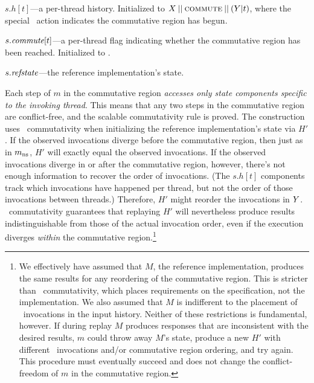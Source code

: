 \begin{CompactItemize}
\item $s.h[t]$---a per-thread history. Initialized to
  $X\mathbin{||}\textsc{commute}\mathbin{||}(Y|t)$, where the special
  \COMMUTE\ action indicates the commutative region has begun.
\item $s.\textit{commute}[t]$---a per-thread flag indicating whether the
  commutative region has been reached. Initialized to \FALSE.
\item $s.\textit{refstate}$---the reference implementation's state.
\end{CompactItemize}

\noindent%
Each step of $m$ in the commutative region \emph{accesses
only state components specific to the invoking thread}.
%
This means that any two steps in the commutative region are
conflict-free, and the scalable commutativity rule is proved.
%
The construction uses \SIM\ commutativity when initializing the
reference implementation's state via $H'$.
%
If the observed invocations diverge before the commutative region, then
just as in $m_{\text{ns}}$, $H'$ will exactly equal the observed invocations.
%
If the observed invocations diverge in or after the commutative region,
however, there's not enough information to recover the order of
invocations. (The $s.h[t]$ components track which invocations have
happened per thread, but not the order of those invocations between
threads.) Therefore, $H'$ might reorder the invocations in $Y$.
%
\SIM\ commutativity guarantees that replaying $H'$ will nevertheless produce
results indistinguishable from those of the actual invocation order,
even if the execution
diverges \emph{within} the commutative region.\footnote{%
  We effectively have assumed that $M$, the reference
  implementation, produces the same results for any reordering of the
  commutative region. This is stricter than \SIM\ commutativity, which
  places requirements on the {specification}, not the
  implementation. We also assumed that $M$ is indifferent to the
  placement of \CONTINUE\ invocations in
  the input history.  Neither of these restrictions is fundamental, however.  If
  during replay $M$ produces responses that are inconsistent with the
  desired results, $m$ could throw away $M$'s state, produce a new $H'$
  with different \CONTINUE\ invocations and/or commutative region ordering,
  and try again.
  This procedure must eventually succeed and does not change the
  conflict-freedom of $m$ in the commutative region.}

